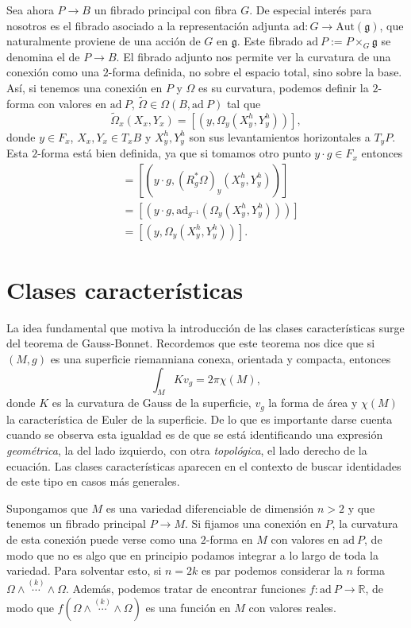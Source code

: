 \documentclass[12pt,a4paper]{article}
\theoremstyle{definition} \newtheorem{defn}[thm]{Definición}
\theoremstyle{definition} \newtheorem{ejemplo}[thm]{Ejemplo}
\theoremstyle{definition} \newtheorem{ejercicio}[thm]{Ejercicio}
\theoremstyle{remark} \newtheorem*{obs}{Observación}
\def\gg{\mathfrak{g}}
\def\ad{\mathrm{ad}}
\def\RR{\mathbb{R}}
\let\emph\relax
\begin{document}
      Sea ahora $P\rightarrow B$ un fibrado principal con fibra $G$. De especial interés para nosotros es el fibrado asociado a la representación adjunta $\ad:G\rightarrow \mathrm{Aut}(\gg)$, que naturalmente proviene de una acción de $G$ en $\gg$. Este fibrado $\ad\ P:=P\times_G \gg$ se denomina el \emph{fibrado adjunto} de $P\rightarrow B$. El fibrado adjunto nos permite ver la curvatura de una conexión como una $2$-forma definida, no sobre el espacio total, sino sobre la base. Así, si tenemos una conexión en $P$ y $\Omega$ es su curvatura, podemos definir la $2$-forma con valores en $\ad\ P$, $\tilde{\Omega}\in \Omega(B,\ad\ P)$ tal que
      \begin{equation*}
	\tilde{\Omega}_x(X_x,Y_x)=[(y,\Omega_y(X_y^h,Y_y^h))],
      \end{equation*}
      donde $y\in F_x$, $X_x,Y_x \in T_xB$ y $X_y^h,Y_y^h$ son sus levantamientos horizontales a $T_y P$. Esta $2$-forma está bien definida, ya que si tomamos otro punto $y\cdot g \in F_x$ entonces
      \begin{align*}
	[(y\cdot g,\Omega_{y\cdot g}(X^h_{y\cdot g},Y^h_{y\cdot g})]&=[(y\cdot g, (R^*_g\Omega)_y(X^h_y,Y^h_y))]\\ &=[(y\cdot g,\ad_{g^{-1}}(\Omega_y(X_y^h,Y_y^h)))]\\&=[(y,\Omega_y(X^h_y,Y^h_y))].
      \end{align*}

	\section{Clases características}
	La idea fundamental que motiva la introducción de las clases características surge del teorema de Gauss-Bonnet. Recordemos que este teorema nos dice que si $(M,g)$ es una superficie riemanniana conexa, orientada y compacta, entonces
	\begin{equation*}
	  \int_M K v_g = 2\pi \chi(M),
	\end{equation*}
	donde $K$ es la curvatura de Gauss de la superficie, $v_g$ la forma de área y $\chi(M)$ la característica de Euler de la superficie. De lo que es importante darse cuenta cuando se observa esta igualdad es de que se está identificando una expresión \textit{geométrica}, la del lado izquierdo, con otra \textit{topológica}, el lado derecho de la ecuación. Las clases características aparecen en el contexto de buscar identidades de este tipo en casos más generales. 

	Supongamos que $M$ es una variedad diferenciable de dimensión $n>2$ y que tenemos un fibrado principal $P\rightarrow M$. Si fijamos una conexión en $P$, la curvatura de esta conexión puede verse como una $2$-forma en $M$ con valores en $\ad\ P$, de modo que no es algo que en principio podamos integrar a lo largo de toda la variedad. Para solventar esto, si $n=2k$ es par podemos considerar la $n$ forma $\Omega\wedge \overset{(k)}{\cdots} \wedge \Omega$. Además, podemos tratar de encontrar funciones $f: \ad\ P \rightarrow \RR$, de modo que $f(\Omega\wedge \overset{(k)}{\cdots} \wedge \Omega)$ es una función en $M$ con valores reales.
\end{document}

